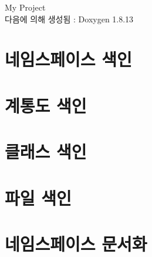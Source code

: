 \documentclass[twoside]{book}
\newcommand{\+}{\discretionary{\mbox{\scriptsize$\hookleftarrow$}}{}{}}
\newcommand{\clearemptydoublepage}{%
  \newpage{\pagestyle{empty}\cleardoublepage}%
}
\begin{document}
\hypersetup{pageanchor=false,
             bookmarksnumbered=true,
             pdfencoding=unicode
            }
\begin{titlepage}
\vspace*{7cm}
\begin{center}%
{\Large My Project }\\
\vspace*{1cm}
{\large 다음에 의해 생성됨 \+:  Doxygen 1.8.13}\\
\end{center}
\end{titlepage}
\clearemptydoublepage
{}
\tableofcontents
\clearemptydoublepage
{}
\hypersetup{pageanchor=true}

\chapter{네임스페이스 색인}

\chapter{계통도 색인}

\chapter{클래스 색인}

\chapter{파일 색인}

\chapter{네임스페이스 문서화}

















\end{document}
